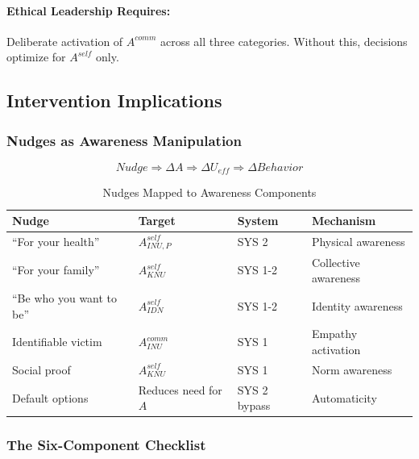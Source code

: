 \paragraph{Ethical Leadership Requires:}
Deliberate activation of $A^{comm}$ across all three categories.
Without this, decisions optimize for $A^{self}$ only.

\subsection{Intervention Implications}
\label{subsec:awareness-interventions}

\subsubsection{Nudges as Awareness Manipulation}

\begin{equation}
Nudge \Rightarrow \Delta A \Rightarrow \Delta U_{eff} \Rightarrow \Delta Behavior
\end{equation}

\begin{table}[htbp]
\centering
\caption{Nudges Mapped to Awareness Components}
\label{tab:nudges-mapping}
\renewcommand{\arraystretch}{1.3}
\begin{tabular}{@{}llll@{}}
\toprule
\textbf{Nudge} & \textbf{Target} & \textbf{System} & \textbf{Mechanism} \\
\midrule
``For your health'' & $A^{self}_{INU,P}$ & SYS 2 & Physical awareness \\
``For your family'' & $A^{self}_{KNU}$ & SYS 1-2 & Collective awareness \\
``Be who you want to be'' & $A^{self}_{IDN}$ & SYS 1-2 & Identity awareness \\
Identifiable victim & $A^{comm}_{INU}$ & SYS 1 & Empathy activation \\
Social proof & $A^{self}_{KNU}$ & SYS 1 & Norm awareness \\
Default options & Reduces need for $A$ & SYS 2 bypass & Automaticity \\
\bottomrule
\end{tabular}
\end{table}

\subsubsection{The Six-Component Checklist}

